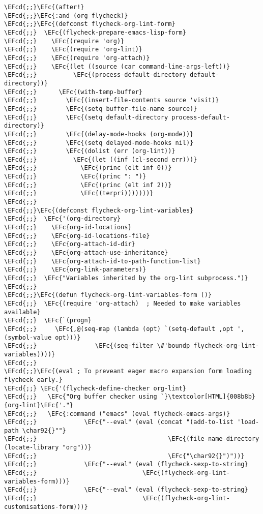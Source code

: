 \documentclass{article}
\newcommand{\EFc}[1]{\textcolor{EFc}{#1}} %
\newcommand{\EFcd}[1]{\textcolor{EFcd}{#1}} %
\begin{document}
\begin{Code}
\begin{Verbatim}
\EFcd{;;}\EFc{(after!}
\EFcd{;;}\EFc{:and (org flycheck)}
\EFcd{;;}\EFc{(defconst flycheck-org-lint-form}
\EFcd{;;}  \EFc{(flycheck-prepare-emacs-lisp-form}
\EFcd{;;}    \EFc{(require 'org)}
\EFcd{;;}    \EFc{(require 'org-lint)}
\EFcd{;;}    \EFc{(require 'org-attach)}
\EFcd{;;}    \EFc{(let ((source (car command-line-args-left))}
\EFcd{;;}          \EFc{(process-default-directory default-directory))}
\EFcd{;;}      \EFc{(with-temp-buffer}
\EFcd{;;}        \EFc{(insert-file-contents source 'visit)}
\EFcd{;;}        \EFc{(setq buffer-file-name source)}
\EFcd{;;}        \EFc{(setq default-directory process-default-directory)}
\EFcd{;;}        \EFc{(delay-mode-hooks (org-mode))}
\EFcd{;;}        \EFc{(setq delayed-mode-hooks nil)}
\EFcd{;;}        \EFc{(dolist (err (org-lint))}
\EFcd{;;}          \EFc{(let ((inf (cl-second err)))}
\EFcd{;;}            \EFc{(princ (elt inf 0))}
\EFcd{;;}            \EFc{(princ ": ")}
\EFcd{;;}            \EFc{(princ (elt inf 2))}
\EFcd{;;}            \EFc{(terpri)))))))}
\EFcd{;;}
\EFcd{;;}\EFc{(defconst flycheck-org-lint-variables}
\EFcd{;;}  \EFc{'(org-directory}
\EFcd{;;}    \EFc{org-id-locations}
\EFcd{;;}    \EFc{org-id-locations-file}
\EFcd{;;}    \EFc{org-attach-id-dir}
\EFcd{;;}    \EFc{org-attach-use-inheritance}
\EFcd{;;}    \EFc{org-attach-id-to-path-function-list}
\EFcd{;;}    \EFc{org-link-parameters)}
\EFcd{;;}  \EFc{"Variables inherited by the org-lint subprocess.")}
\EFcd{;;}
\EFcd{;;}\EFc{(defun flycheck-org-lint-variables-form ()}
\EFcd{;;}  \EFc{(require 'org-attach)  ; Needed to make variables available}
\EFcd{;;}  \EFc{`(progn}
\EFcd{;;}     \EFc{,@(seq-map (lambda (opt) `(setq-default ,opt ',(symbol-value opt)))}
\EFcd{;;}                \EFc{(seq-filter \#'boundp flycheck-org-lint-variables))))}
\EFcd{;;}
\EFcd{;;}\EFc{(eval ; To preveant eager macro expansion form loading flycheck early.}
\EFcd{;;} \EFc{'(flycheck-define-checker org-lint}
\EFcd{;;}   \EFc{"Org buffer checker using `}\textcolor[HTML]{008b8b}{org-lint}\EFc{'."}
\EFcd{;;}   \EFc{:command ("emacs" (eval flycheck-emacs-args)}
\EFcd{;;}             \EFc{"--eval" (eval (concat "(add-to-list 'load-path \char92{}""}
\EFcd{;;}                                    \EFc{(file-name-directory (locate-library "org"))}
\EFcd{;;}                                    \EFc{"\char92{}")"))}
\EFcd{;;}             \EFc{"--eval" (eval (flycheck-sexp-to-string}
\EFcd{;;}                             \EFc{(flycheck-org-lint-variables-form)))}
\EFcd{;;}             \EFc{"--eval" (eval (flycheck-sexp-to-string}
\EFcd{;;}                             \EFc{(flycheck-org-lint-customisations-form)))}

\end{Verbatim}
\end{Code}
\end{document}
